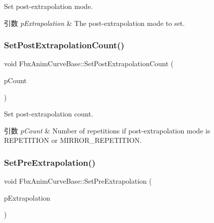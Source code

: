 Set post-\/extrapolation mode. 
\begin{DoxyParams}{引数}
{\em p\+Extrapolation} & The post-\/extrapolation mode to set. \\
\hline
\end{DoxyParams}
\mbox{\label{class_fbx_anim_curve_base_a4201935f2bc54e924658cc0dd4e7bf74}} 
\subsubsection{\texorpdfstring{Set\+Post\+Extrapolation\+Count()}{SetPostExtrapolationCount()}}
{\footnotesize\ttfamily void Fbx\+Anim\+Curve\+Base\+::\+Set\+Post\+Extrapolation\+Count (\begin{DoxyParamCaption}\item[{unsigned long}]{p\+Count }\end{DoxyParamCaption})}

Set post-\/extrapolation count. 
\begin{DoxyParams}{引数}
{\em p\+Count} & Number of repetitions if post-\/extrapolation mode is R\+E\+P\+E\+T\+I\+T\+I\+ON or M\+I\+R\+R\+O\+R\+\_\+\+R\+E\+P\+E\+T\+I\+T\+I\+ON. \\
\hline
\end{DoxyParams}
\mbox{\label{class_fbx_anim_curve_base_abf3ba6c80fe9371be31602eb36789989}} 
\subsubsection{\texorpdfstring{Set\+Pre\+Extrapolation()}{SetPreExtrapolation()}}
{\footnotesize\ttfamily void Fbx\+Anim\+Curve\+Base\+::\+Set\+Pre\+Extrapolation (\begin{DoxyParamCaption}\item[{\hyperlink{class_fbx_anim_curve_base_aa7214d43daa7b6b9b47a8118a858847f}{E\+Extrapolation\+Type}}]{p\+Extrapolation }\end{DoxyParamCaption})}


